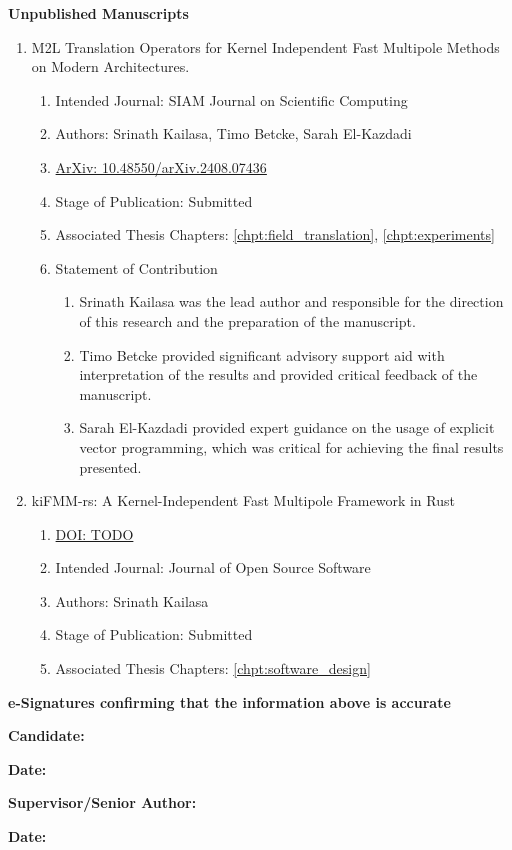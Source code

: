 \textbf{Unpublished Manuscripts}

\begin{enumerate}
    \item M2L Translation Operators for Kernel Independent Fast Multipole Methods on Modern Architectures.
    \begin{enumerate}[label=\alph*)]
      \item Intended Journal: SIAM Journal on Scientific Computing
      \item Authors: Srinath Kailasa, Timo Betcke, Sarah El-Kazdadi
      \item  \href{https://doi.org/10.48550/arXiv.2408.07436}{ArXiv: 10.48550/arXiv.2408.07436}
      \item Stage of Publication: Submitted
      \item Associated Thesis Chapters: \ref{chpt:field_translation}, \ref{chpt:experiments}
      \item Statement of Contribution
      \begin{enumerate}
        \item Srinath Kailasa was the lead author and responsible for the direction of this research and the preparation of the manuscript.
        \item Timo Betcke provided significant advisory support aid with interpretation of the results and provided critical feedback of the manuscript.
        \item Sarah El-Kazdadi provided expert guidance on the usage of explicit vector programming, which was critical for achieving the final results presented.
      \end{enumerate}
    \end{enumerate}

    \item kiFMM-rs: A Kernel-Independent Fast Multipole Framework in Rust
    \begin{enumerate}[label=\alph*)]
      \item \href{https://ieeexplore.ieee.org/document/10124108}{DOI: TODO}
      \item Intended Journal: Journal of Open Source Software
      \item Authors: Srinath Kailasa
      \item Stage of Publication: Submitted
      \item Associated Thesis Chapters: \ref{chpt:software_design}
    \end{enumerate}

\end{enumerate}

\textbf{e-Signatures confirming that the information above is accurate}

\hspace*{10mm}

\textbf{Candidate:}

\textbf{Date:}

\hspace*{10mm}

\textbf{Supervisor/Senior Author:}

\textbf{Date:}
